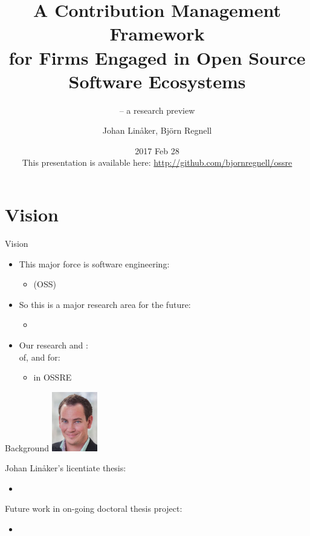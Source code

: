 \documentclass{slides}
\title[Open Source Software Requirements Engineering (OSSRE)]
{\textbf{A Contribution Management Framework}\\{\small for Firms
Engaged in Open Source Software Ecosystems}}
\subtitle{\small-- a research preview}
\author{Johan Linåker, Björn Regnell}
\institute{Lund University}
\date{2017 Feb 28 \\ 
\vspace{2em}
{\footnotesize This presentation is available here: \url{http://github.com/bjornregnell/ossre}}
}
\begin{document}
\frame{\titlepage}
\frame{\tableofcontents}

\section{Vision}
\begin{Slide}{Vision}
\begin{itemize}
\item This major force is  software engineering:\pause
\begin{itemize}
\item[]  (OSS)
\end{itemize}
\item So this is a major research area for the future:\pause
\begin{itemize}
\item[] 
\end{itemize}

\vspace{1em}

\item Our research  and :\\
\vspace{1em}
 of, and  for:
\begin{itemize}
\item {} in OSSRE
\end{itemize}
\end{itemize}
\end{Slide}

\begin{Slide}{Background}
\includegraphics[width=2cm]{../img/Johan_Linaker_197}

Johan Linåker's licentiate thesis:
\begin{itemize}
\item
\end{itemize}
Future work in on-going doctoral thesis project:
\begin{itemize}
\item 
\end{itemize}

\end{Slide}
\end{document}
